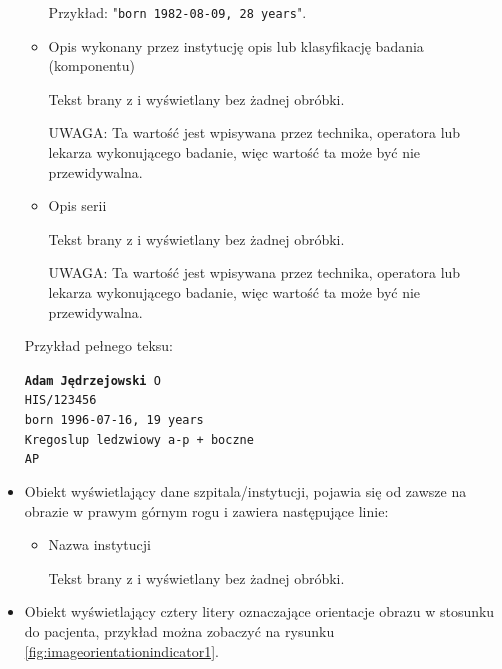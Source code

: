 \begin{itemize}
\begin{itemize}
        Przykład: "\texttt{born 1982-08-09, 28 years}".

        \item Opis wykonany przez instytucję opis lub klasyfikację badania (komponentu)
        
        Tekst brany z  i wyświetlany bez żadnej obróbki.

        UWAGA: Ta wartość jest wpisywana przez technika, operatora lub lekarza wykonującego badanie, więc wartość ta może być nie przewidywalna.

        \item Opis serii
        
        Tekst brany z  i wyświetlany bez żadnej obróbki.
        
        UWAGA: Ta wartość jest wpisywana przez technika, operatora lub lekarza wykonującego badanie, więc wartość ta może być nie przewidywalna.
    \end{itemize}

    Przykład pełnego teksu:
    
    \texttt{\textbf{Adam Jędrzejowski} O\\
    HIS/123456\\
    born 1996-07-16, 19 years\\
    Kregoslup ledzwiowy a-p + boczne\\
    AP
    }
    
    \item {}
    
    Obiekt wyświetlający dane szpitala/instytucji, pojawia się od zawsze na obrazie w prawym górnym rogu i zawiera następujące linie:
    \begin{itemize}
        \item Nazwa instytucji
        
        Tekst brany z  i wyświetlany bez żadnej obróbki.
        
    \end{itemize}

    \item {}

    Obiekt wyświetlający cztery litery oznaczające orientacje obrazu w stosunku do pacjenta, przykład można zobaczyć na rysunku \ref{fig:imageorientationindicator1}.


\end{itemize}
